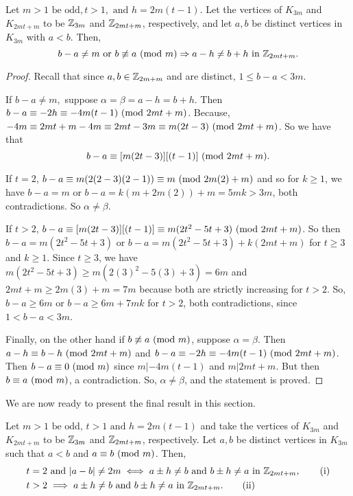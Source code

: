 \begin{thm}
  Let $m>1\text{ be odd},t>1,\text{ and } h = 2m(t-1)$. Let the vertices of $K_{3m}$ and $K_{2mt+m}$ to be $\mathbb{Z}_{3m}$ and $\mathbb{Z}_{2mt+m}$, respectively, and let $a,b$ be distinct vertices in $K_{3m}$ with $a<b$. Then,
    $$b-a\neq m\text{ or }b\not\equiv a\ (\mathrm{mod}\ m)\Rightarrow a-h \neq b+h\text{ in }\mathbb{Z}_{2mt+m}.$$

    \begin{proof}
        Recall that since $a,b\in \mathbb{Z}_{2m+m}$ and are distinct, $1\leq b-a<3m$.\newline 
        
        \noindent If $b-a\neq m,$ suppose $\alpha = \beta = a-h=b+h$. Then $b-a\equiv -2h\equiv -4m(t-1)\ (\mathrm{mod}\ 2mt+m)$. Because,  $-4m \equiv 2mt+m-4m\equiv 2mt-3m\equiv m(2t-3)\ (\mathrm{mod}\ 2mt+m)$. So we have that $$b-a\equiv [m(2t-3)][(t-1)]\ (\mathrm{mod}\ 2mt+m).$$
        
        \noindent If $t=2$, $b-a\equiv m(2(2-3)(2-1))\equiv m\ (\mathrm{mod}\ 2m(2)+m)$ and so for $k\geq 1$, we have $b-a = m$ or $b-a= k(m+2m(2))+m = 5mk>3m$, both contradictions. So $\alpha\neq \beta$.\newline
        
        \noindent If $t>2$, $b-a\equiv [m(2t-3)][(t-1)] \equiv m(2t^{2}-5t+3)\ (\mathrm{mod}\ 2mt+m)$. So then $b-a=m(2t^{2}-5t+3)$ or $b-a=m(2t^{2}-5t+3) + k(2mt+m)$ for $t\geq 3$ and $k\geq 1$. Since $t\geq 3$, we have $m(2t^{2}-5t+3)\geq m(2(3)^{2}-5(3)+3)=6m$ and $2mt+m\geq 2m(3)+m=7m$ because both are strictly increasing for $t>2$. So, $b-a\geq 6m$ or $b-a\geq 6m+7mk$ for $t>2$, both contradictions, since $1<b-a<3m$.\newline

        \noindent Finally, on the other hand if $b\not\equiv a\ (\mathrm{mod}\ m)$, suppose $\alpha = \beta$. Then $a-h\equiv b-h \ (\mathrm{mod}\ 2mt+m)$ and $b-a\equiv -2h\equiv -4m(t-1)\ (\mathrm{mod}\ 2mt+m)$. Then $b-a\equiv 0\ (\mathrm{mod}\ m)$ since $m|-4m(t-1)$ and $m|2mt+m.$ But then $b\equiv a\ (\mathrm{mod}\ m)$, a contradiction. So, $\alpha\neq \beta$, and the statement is proved.
        
    \end{proof}
\end{thm}
We are now ready to present the final result in this section.
\begin{corollary}\label{thm:gennewvertices}
    Let $m>1\text{ be odd},\,t>1\text{ and }h=2m(t-1)$ and take the vertices of $K_{3m}$ and $K_{2mt+m}$ to be $\mathbb{Z}_{3m}$ and $\mathbb{Z}_{2mt+m}$, respectively. Let $a,b$ be distinct vertices in $K_{3m}$ such that $a<b$ and $a\equiv b\ (\mathrm{mod}\ m)$. Then,
    \begin{align}
    &t=2\text{ and }|a-b|\neq 2m\iff a\pm h\neq b\text{ and }b\pm h \neq a\text{ in }\mathbb{Z}_{2mt+m}, \tag{i}\\
    &t>2\implies a\pm h\neq b\text{ and }b\pm h \neq a\text{ in }\mathbb{Z}_{2mt+m}.\tag{ii}
    \end{align}
\end{corollary}
